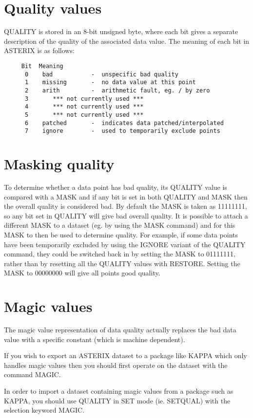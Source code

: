\documentclass{book}
\renewcommand{\_}{{\tt\char'137}}     %
\begin{document}
\section{Quality values}
QUALITY is stored in an 8-bit unsigned byte, where each bit gives a
separate description of the quality of the associated data value. The
meaning of each bit in ASTERIX is as follows:

\begin{verbatim}
     Bit  Meaning
      0    bad           -  unspecific bad quality
      1    missing       -  no data value at this point
      2    arith         -  arithmetic fault, eg. / by zero
      3       *** not currently used ***
      4       *** not currently used ***
      5       *** not currently used ***
      6    patched       -  indicates data patched/interpolated
      7    ignore        -  used to temporarily exclude points
\end{verbatim}
\section{Masking quality}
To determine whether a data point has bad quality, its QUALITY value
is compared with a MASK and if any bit is set in both QUALITY and MASK
then the overall quality is considered bad. By default the MASK is taken
as 11111111, so any bit set in QUALITY will give bad overall quality.
It is possible to attach a different MASK to a dataset (eg. by using
the MASK command) and for this MASK to then be used to determine
quality. For example, if some data points have been temporarily
excluded by using the IGNORE variant of the QUALITY command, they could
be switched back in by setting the MASK to 01111111, rather than by
resetting all the QUALITY values with RESTORE. Setting the MASK to
00000000 will give all points good quality.

\section{Magic values}
The magic value representation of data quality actually replaces the
bad data value with a specific constant (which is machine dependent).

If you wish to export an ASTERIX dataset to a package like KAPPA which
only handles magic values then you should first operate on the dataset
with the command MAGIC.

In order to import a dataset containing magic values from a package
such as KAPPA, you should use QUALITY in SET mode (ie. SETQUAL) with
the selection keyword MAGIC.
\end{document}
